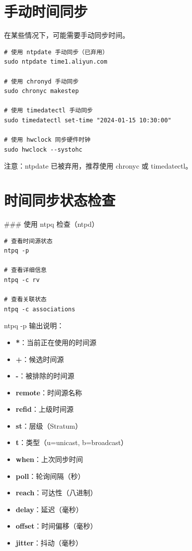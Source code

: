 \documentclass[12pt,UTF8]{ctexbook}
\begin{document}
\section{手动时间同步}
\label{sec:manual_sync}

在某些情况下，可能需要手动同步时间。

\begin{verbatim}
# 使用 ntpdate 手动同步（已弃用）
sudo ntpdate time1.aliyun.com

# 使用 chronyd 手动同步
sudo chronyc makestep

# 使用 timedatectl 手动同步
sudo timedatectl set-time "2024-01-15 10:30:00"

# 使用 hwclock 同步硬件时钟
sudo hwclock --systohc
\end{verbatim}

注意：ntpdate 已被弃用，推荐使用 chronyc 或 timedatectl。

\section{时间同步状态检查}
\label{sec:check_sync_status}

### 使用 ntpq 检查（ntpd）

\begin{verbatim}
# 查看时间源状态
ntpq -p

# 查看详细信息
ntpq -c rv

# 查看关联状态
ntpq -c associations
\end{verbatim}

ntpq -p 输出说明：
\begin{itemize}
    \item \textbf{*}：当前正在使用的时间源
    \item \textbf{+}：候选时间源
    \item \textbf{-}：被排除的时间源
    \item \textbf{remote}：时间源名称
    \item \textbf{refid}：上级时间源
    \item \textbf{st}：层级（Stratum）
    \item \textbf{t}：类型（u=unicast, b=broadcast）
    \item \textbf{when}：上次同步时间
    \item \textbf{poll}：轮询间隔（秒）
    \item \textbf{reach}：可达性（八进制）
    \item \textbf{delay}：延迟（毫秒）
    \item \textbf{offset}：时间偏移（毫秒）
    \item \textbf{jitter}：抖动（毫秒）
\end{itemize}
\end{document}
